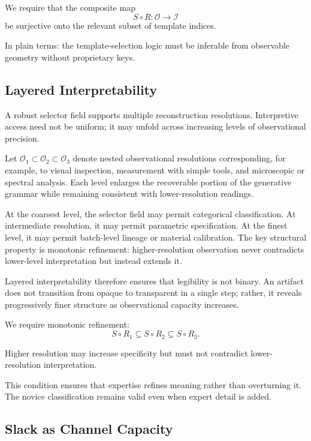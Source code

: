 \documentclass[11pt]{article}
\begin{document}
We require that the composite map
\[
S \circ R : \mathcal{O} \rightarrow \mathcal{I}
\]
be surjective onto the relevant subset of template indices.

In plain terms: the template-selection logic must be inferable from 
observable geometry without proprietary keys.

\subsection{Layered Interpretability}

A robust selector field supports multiple reconstruction resolutions.
Interpretive access need not be uniform; it may unfold across increasing
levels of observational precision.

Let $\mathcal{O}_1 \subset \mathcal{O}_2 \subset \mathcal{O}_3$ denote
nested observational resolutions corresponding, for example, to visual
inspection, measurement with simple tools, and microscopic or spectral
analysis. Each level enlarges the recoverable portion of the generative
grammar while remaining consistent with lower-resolution readings.

At the coarsest level, the selector field may permit categorical
classification. At intermediate resolution, it may permit parametric
specification. At the finest level, it may permit batch-level lineage or
material calibration. The key structural property is monotonic
refinement: higher-resolution observation never contradicts lower-level
interpretation but instead extends it.

Layered interpretability therefore ensures that legibility is not
binary. An artifact does not transition from opaque to transparent in a
single step; rather, it reveals progressively finer structure as
observational capacity increases.

We require monotonic refinement:
\[
S \circ R_1 \subseteq S \circ R_2 \subseteq S \circ R_3.
\]

Higher resolution may increase specificity but must not contradict 
lower-resolution interpretation.

This condition ensures that expertise refines meaning rather than 
overturning it. The novice classification remains valid even when 
expert detail is added.

\subsection{Slack as Channel Capacity}
\end{document}
